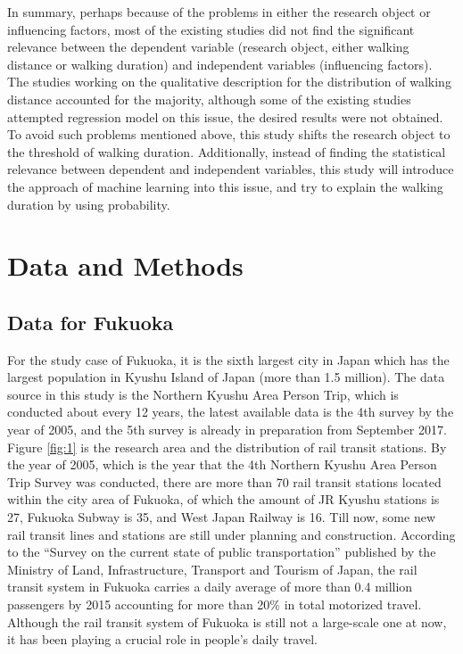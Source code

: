 \documentclass[Journal,letterpaper]{ascelike-new}
\begin{document}
%
In summary, perhaps because of the problems in either the research object or influencing factors, most of the existing studies did not find the significant relevance between the dependent variable (research object, either walking distance or walking duration) and independent variables (influencing factors). The studies working on the qualitative description for the distribution of walking distance accounted for the majority, although some of the existing studies attempted regression model on this issue, the desired results were not obtained. To avoid such problems mentioned above, this study shifts the research object to the threshold of walking duration. Additionally, instead of finding the statistical relevance between dependent and independent variables, this study will introduce the approach of machine learning into this issue, and try to explain the walking duration by using probability.
%
\section{Data and Methods}
%
\subsection{Data for Fukuoka}
For the study case of Fukuoka, it is the sixth largest city in Japan which has the largest population in Kyushu Island of Japan (more than 1.5 million). The data source in this study is the Northern Kyushu Area Person Trip, which is conducted about every 12 years, the latest available data is the 4th survey by the year of 2005, and the 5th survey is already in preparation from September 2017. Figure \ref{fig:1} is the research area and the distribution of rail transit stations. By the year of 2005, which is the year that the 4th Northern Kyushu Area Person Trip Survey was conducted, there are more than 70 rail transit stations located within the city area of Fukuoka, of which the amount of JR Kyushu stations is 27, Fukuoka Subway is 35, and West Japan Railway is 16. Till now, some new rail transit lines and stations are still under planning and construction. According to the “Survey on the current state of public transportation” published by the Ministry of Land, Infrastructure, Transport and Tourism of Japan, the rail transit system in Fukuoka carries a daily average of more than 0.4 million passengers by 2015 accounting for more than 20\% in total motorized travel. Although the rail transit system of Fukuoka is still not a large-scale one at now, it has been playing a crucial role in people's daily travel.
%
\end{document}
